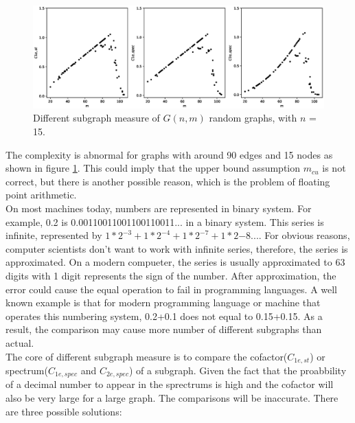 \documentclass[12pt]{article}
\begin{document}
\begin{figure}[ht]
    \includegraphics[width=\textwidth]{subgraph_measures.eps}
    \caption{Different subgraph measure of $G(n,m)$ random graphs, with $n$ = 15.}
    \label{fig:subgraph_measure}
\end{figure}
\noindent
The complexity is abnormal for graphs with around 90 edges and 15 nodes as shown in figure \ref{fig:subgraph_measure}. This could imply that the upper bound assumption $m_{cu}$ is not correct, but there is another possible reason, which is the problem of floating point arithmetic.\\
On most machines today, numbers are represented in binary system\cite{floating_point}. For example, 0.2 is 0.00110011001100110011... in a binary system. This series is infinite, represented by $1*2^{-3}+1*2^{-4}+1*2^{-7}+1*2{-8}...$. For obvious reasons, computer scientists don't want to work with infinite series, therefore, the series is approximated. On a modern compueter, the series is usually approximated to 63 digits with 1 digit represents the sign of the number. After approximation, the error could cause the equal operation to fail in programming languages. A well known example is that for modern programming language or machine that operates this numbering system, 0.2+0.1 does not equal to 0.15+0.15. As a result, the comparison may cause more number of different subgraphs than actual.\\
The core of different subgraph measure is to compare the cofactor($C_{1e,st}$) or spectrum($C_{1e,spec}$ and $C_{2e,spec}$) of a subgraph. Given the fact that the proabbility of a decimal number to appear in the sprectrums is high and the cofactor will also be very large for a large graph. The comparisons will be inaccurate. There are three possible solutions:
\end{document}
